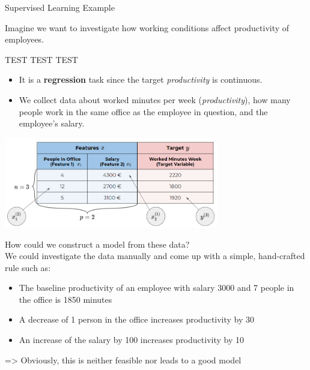 \begin{vbframe}{Supervised Learning Example}

Imagine we want to investigate how working conditions affect productivity of employees.

TEST TEST TEST

\begin{itemize}
	\item It is a \textbf{regression} task since the target \emph{productivity} is continuous.
	\item We collect data about worked minutes
per week (\emph{productivity}), how many people work in the same office as the
employee in question, and the employee's salary.
\end{itemize}

\begin{center}
  \includegraphics[width = 0.7\textwidth]{figure_man/data_table}
\end{center}

\framebreak

How could we construct a model from these data?\\[1ex]

We could investigate the data manually and come up with a simple, hand-crafted rule such as:

	\begin{itemize}
		\item The baseline productivity of an employee with salary 3000 and 7 people in the office is 1850 minutes
		\item A decrease of 1 person in the office increases productivity by 30
		\item An increase of the salary by 100 increases productivity by 10
	\end{itemize}

=> Obviously, this is neither feasible nor leads to a good model
\end{vbframe}



